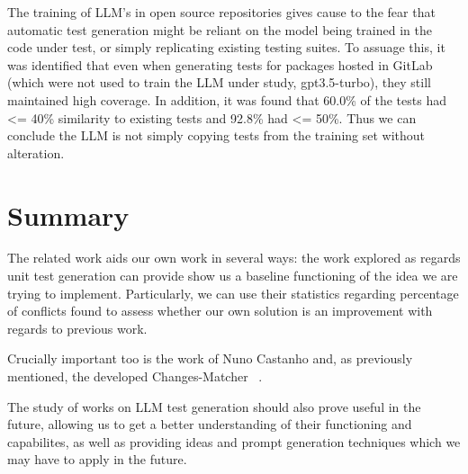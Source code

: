 The training of LLM's in open source repositories gives cause to the fear that automatic test generation might be reliant on the model being trained in the code under test, or simply replicating existing testing suites. To assuage this, it was identified that even when generating tests for packages hosted in GitLab (which were not used to train the LLM under study, gpt3.5-turbo), they still maintained high coverage. In addition, it was found that 60.0\% of the tests had <= 40\% similarity to existing tests and 92.8\% had <= 50\%. Thus we can conclude the LLM is not simply copying tests from the training set without alteration\citep{kn:max}.


\section{Summary}

The related work aids our own work in several ways: the work explored as regards unit test generation can provide show us a baseline functioning of the idea we are trying to implement. Particularly, we can use their statistics regarding percentage of conflicts found to assess whether our own solution is an improvement with regards to previous work.

Crucially important too is the work of Nuno Castanho and, as previously mentioned, the developed Changes-Matcher ~\citep{kn:nuno}.

The study of works on LLM test generation should also prove useful in the future, allowing us to get a better understanding of their functioning and capabilites, as well as providing ideas and prompt generation techniques which we may have to apply in the future.